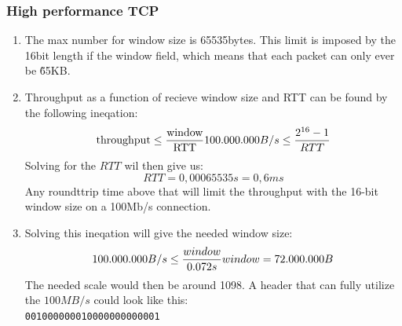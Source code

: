 \documentclass[10pt]{article}
\begin{document}
\subsubsection{High performance TCP}
\begin{enumerate}
  \item The max number for window size is 65535bytes. This limit is imposed by
        the 16bit length if the window field, which means that each packet can
        only ever be \~65KB.
  \item Throughput as a function of recieve window size and RTT can be found by
        the following ineqation:
        \[
            \text{throughput} \leq \frac{\text{window}}{\text{RTT}}\\
            100.000.000B/s \leq \frac{2^{16}-1}{RTT}
        \]
        Solving for the $RTT$ wil then give us:
        \[
            RTT = 0,00065535s = 0,6ms
        \]
        Any roundttrip time above that will limit the throughput with the 16-bit
        window size on a 100Mb/s connection.
  \item Solving this ineqation will give the needed window size:
        \[
            100.000.000B/s \leq \frac{window}{0.072s}\\
            window = 72.000.000B
        \]
        The needed scale would then be around 1098.
        A header that can fully utilize the $100MB/s$ could look like this:\\
        \texttt{001000000010000000000001}
\end{enumerate}
\end{document}
